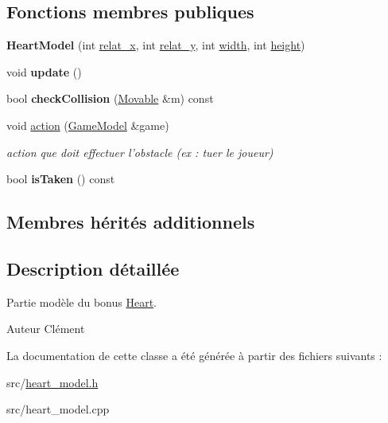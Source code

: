 \subsection*{Fonctions membres publiques}
\begin{DoxyCompactItemize}
\item 
\hypertarget{class_heart_model_aa2684794131615c1e2230c6f0451c2da}{{\bfseries Heart\+Model} (int \hyperlink{class_obstacle_a37056563c8469b38aa240c7c423d7280}{relat\+\_\+x}, int \hyperlink{class_obstacle_a754f463db00e74fd5d66a758e4458c26}{relat\+\_\+y}, int \hyperlink{class_movable_a7e4607cccfcc96d2007c2e39c44cab54}{width}, int \hyperlink{class_movable_a192073065bc62d054f259c3b1522c09e}{height})}\label{class_heart_model_aa2684794131615c1e2230c6f0451c2da}

\item 
\hypertarget{class_heart_model_a1c13541e1ff017d706f365bc71882590}{void {\bfseries update} ()}\label{class_heart_model_a1c13541e1ff017d706f365bc71882590}

\item 
\hypertarget{class_heart_model_af29bd7dc1f5d852a901e2807526ac5f5}{bool {\bfseries check\+Collision} (\hyperlink{class_movable}{Movable} \&m) const }\label{class_heart_model_af29bd7dc1f5d852a901e2807526ac5f5}

\item 
\hypertarget{class_heart_model_a5244fa59d1d1927c276e6f6f3da77912}{void \hyperlink{class_heart_model_a5244fa59d1d1927c276e6f6f3da77912}{action} (\hyperlink{class_game_model}{Game\+Model} \&game)}\label{class_heart_model_a5244fa59d1d1927c276e6f6f3da77912}

\begin{DoxyCompactList}\small\item\em action que doit effectuer l'obstacle (ex \+: tuer le joueur) \end{DoxyCompactList}\item 
\hypertarget{class_heart_model_ae87ec3832dcc90ebd530598e51a8103f}{bool {\bfseries is\+Taken} () const }\label{class_heart_model_ae87ec3832dcc90ebd530598e51a8103f}

\end{DoxyCompactItemize}
\subsection*{Membres hérités additionnels}


\subsection{Description détaillée}
Partie modèle du bonus \hyperlink{class_heart}{Heart}. 

\begin{DoxyAuthor}{Auteur}
Clément 
\end{DoxyAuthor}


La documentation de cette classe a été générée à partir des fichiers suivants \+:\begin{DoxyCompactItemize}
\item 
src/\hyperlink{heart__model_8h}{heart\+\_\+model.\+h}\item 
src/heart\+\_\+model.\+cpp\end{DoxyCompactItemize}
